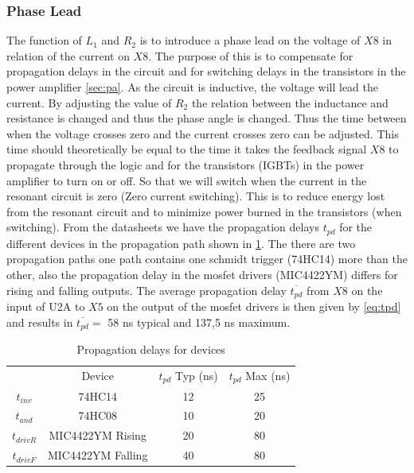 \subsubsection{Phase Lead}
\label{sec:phaselead}
The function of $L_1$ and $R_2$ is to introduce a phase lead on the voltage of $X8$ in relation of the current on $X8$. The purpose of this is to compensate for propagation delays in the circuit and for switching delays in the transistors in the power amplifier \cref{sec:pa}. As the circuit is inductive, the voltage will lead the current. By adjusting the value of $R_2$ the relation between the inductance and resistance is changed and thus the phase angle is changed. Thus the time between when the voltage crosses zero and the current crosses zero can be adjusted. This time should theoretically be equal to the time it takes the feedback signal $X8$ to propagate through the logic and for the transistors (IGBTs) in the power amplifier to turn on or off. So that we will switch when the current in the resonant circuit is zero (Zero current switching). This is to reduce energy lost from the resonant circuit and to minimize power burned in the transistors (when switching). From the datasheets we have the propagation delays $t_{pd}$ for the different devices in the propagation path shown in \cref{tab:tpd}. The there are two propagation paths one path contains one schmidt trigger (74HC14) more than the other, also the propagation delay in the mosfet drivers (MIC4422YM) differs for rising and falling outputs. The average propagation delay $\overline{t_{pd}}$ from $X8$ on the input of U2A to $X5$ on the output of the mosfet drivers is then given by \cref{eq:tpd} and results in $\overline{t_{pd}} =$ 58 ns typical and 137,5 ns maximum.

\begin{table}[H]
    \centering
    \begin{tabular}{c|c|c|c}
                &   Device              & $t_{pd}$ Typ (ns)   & $t_{pd}$ Max (ns) \\
        $t_{inv}$ &   74HC14              & 12            & 25\\
        $t_{and}$ &   74HC08              & 10            & 20\\
        $t_{driv R}$& MIC4422YM Rising    & 20            & 80\\
        $t_{driv F}$& MIC4422YM Falling   & 40            & 80
    \end{tabular}
    \caption{Propagation delays for devices}
    \label{tab:tpd}
\end{table}

